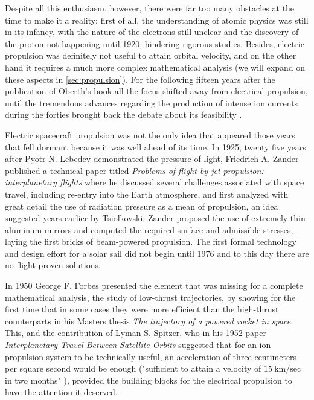Despite all this enthusiasm, however, there were far too many obstacles at the time to make it a reality: first of all, the understanding of atomic physics was still in its infancy, with the nature of the electrons still unclear and the discovery of the proton not happening until 1920, hindering rigorous studies. Besides, electric propulsion was definitely not useful to attain orbital velocity, and on the other hand it requires a much more complex mathematical analysis (we will expand on these aspects in \ref{sec:propulsion}). For the following fifteen years after the publication of Oberth's book all the focus shifted away from electrical propulsion, until the tremendous advances regarding the production of intense ion currents during the forties brought back the debate about its feasibility \cite{choueiri2004history}.

Electric spacecraft propulsion was not the only idea that appeared those years that fell dormant because it was well ahead of its time. In 1925, twenty five years after Pyotr N. Lebedev demonstrated the pressure of light, Friedrich A. Zander published a technical paper titled \textit{Problems of flight by jet propulsion: interplanetary flights} where he discussed several challenges associated with space travel, including re-entry into the Earth atmosphere, and first analyzed with great detail the use of radiation pressure as a mean of propulsion, an idea suggested years earlier by Tsiolkovski. Zander proposed the use of extremely thin aluminum mirrors and computed the required surface and admissible stresses, laying the first bricks of beam-powered propulsion. The first formal technology and design effort for a solar sail did not begin until  1976 and to this day there are no flight proven solutions.

In 1950 George F. Forbes presented the element that was missing for a complete mathematical analysis, the study of low-thrust trajectories, by showing for the first time that in some cases they were more efficient than the high-thrust counterparts in his Masters thesis \textit{The trajectory of a powered rocket in space}. This, and the contribution of Lyman S. Spitzer, who in his 1952 paper \textit{Interplanetary Travel Between Satellite Orbits} suggested that for an ion propulsion system to be technically useful, an acceleration of three centimeters per square second would be enough ("sufficient to attain a velocity of $15~\text{km/sec}$ in two months" \cite{spitzer1952interplanetary}), provided the building blocks for the electrical propulsion to have the attention it deserved.

